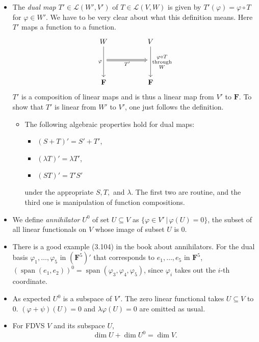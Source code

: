 \documentclass[11pt]{article}
\newcommand{\where}{\,|\,}
\newcommand{\df}[1]{\textit{\textsf{#1}}}
\newcommand{\F}{\mathbf{F}}
\newcommand{\s}{\operatorname{span}}
\renewcommand{\d}{\dim}
\newcommand{\LVW}{\mathcal{L}(V,W)}
\renewcommand{\phi}{\varphi}
\begin{document}
\begin{itemize}
    \item The \df{dual map} $T' \in \mathcal{L}(W',V')$ of $T \in \LVW$ is given by $T'(\phi)=\phi \circ T$ for $\phi \in W'$. We have to be very clear about what this definition means. Here $T'$ maps a function to a function.
    \begin{equation*}
        \begin{tikzcd}
            W \arrow[dd, "\phi"'] &  & V 
            \arrow[dd, "\substack{\phi \circ T \\ \text{through} \\ W}"] \\
            {} \arrow[rr, "T'"', Rightarrow] &  & {} \\
            \F &  & \F
        \end{tikzcd}
    \end{equation*}
    $T'$ is a composition of linear maps and is thus a linear map from $V'$ to $\F$. To show that $T'$ is linear from $W'$ to $V'$, one just follows the definition.
    \begin{itemize}
        \item The following algebraic properties hold for dual maps:
        \begin{itemize}
            \item $(S+T)'=S'+T'$,
            \item $(\lambda T)'=\lambda T'$,
            \item $(ST)'=T'S'$
        \end{itemize}
        under the appropriate $S,T,$ and $\lambda$. The first two are routine, and the third one is manipulation of function compositions.
    \end{itemize}
    \item We define \df{annihilator} $U^0$ of set $U \subseteq V$ as $\{\phi \in V' \where \phi(U)=0\}$, the subset of all linear functionals on $V$ whose image of subset $U$ is 0.
    \item There is a good example (3.104) in the book about annihilators. For the dual basis $\phi_1,\dots,\phi_5$ in $(\F^5)'$ that corresponds to $e_1,\dots,e_5$ in $\F^5$, $(\s(e_1,e_2))^0 = \s(\phi_3,\phi_4,\phi_5)$, since $\phi_i$ takes out the $i$-th coordinate.
    \item As expected $U^0$ is a subspace of $V'$. The zero linear functional takes $U \subseteq V$ to $0$. $(\phi+\psi)(U) = 0$ and $\lambda\phi(U) = 0$ are omitted as usual.
    \item For FDVS $V$ and its subspace $U$, \[\d U + \d U^0 = \d V.\]
    

\end{itemize}
\end{document}
